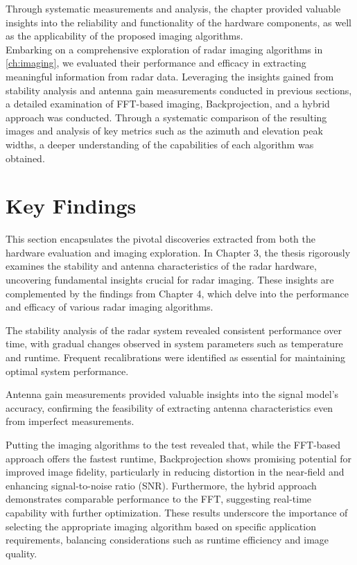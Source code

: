 Through systematic measurements and analysis, the chapter provided valuable insights
into the reliability and functionality of the hardware components,
as well as the applicability of the proposed imaging algorithms.
\\
Embarking on a comprehensive exploration of radar imaging algorithms in \cref{ch:imaging},
we evaluated their performance and efficacy in extracting meaningful information from radar data.
Leveraging the insights gained from stability analysis and antenna gain measurements
conducted in previous sections, a detailed examination of FFT-based imaging,
Backprojection, and a hybrid approach was conducted.
Through a systematic comparison of the resulting images and analysis of key metrics
such as the azimuth and elevation peak widths, a deeper understanding of the capabilities
of each algorithm was obtained.

\section{Key Findings}
This section encapsulates the pivotal discoveries extracted from both the hardware evaluation and imaging exploration.
In Chapter 3, the thesis rigorously examines the stability and antenna characteristics of the radar hardware,
uncovering fundamental insights crucial for radar imaging. These insights are complemented by the findings from Chapter 4,
which delve into the performance and efficacy of various radar imaging algorithms.

The stability analysis of the radar system revealed consistent performance over time,
with gradual changes observed in system parameters such as temperature and runtime.
Frequent recalibrations were identified as essential for maintaining optimal system performance.

Antenna gain measurements provided valuable insights into the signal model's accuracy,
confirming the feasibility of extracting antenna characteristics even from imperfect measurements.

Putting the imaging algorithms to the test revealed that,
while the FFT-based approach offers the fastest runtime, Backprojection shows promising potential
for improved image fidelity, particularly in reducing distortion in the near-field
and enhancing signal-to-noise ratio (SNR). Furthermore, the hybrid approach demonstrates
comparable performance to the FFT, suggesting real-time capability with further optimization.
These results underscore the importance of selecting the appropriate imaging algorithm based
on specific application requirements, balancing considerations such as runtime efficiency
and image quality.

